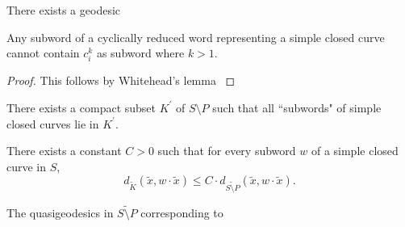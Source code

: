 \begin{lem}
	There exists a geodesic 
\end{lem}
\begin{lem}
	Any subword of a cyclically reduced word representing a simple closed curve cannot contain $c_i^k$ as subword where $k > 1$.
\end{lem}
\begin{proof}
	This follows by Whitehead's lemma \cite[Corollary 4.3]{Minsky}
\end{proof}

\begin{lem}
	There exists a compact subset $K^\prime$ of $S \setminus P$ such that all ``subwords" of simple closed curves lie in $K^\prime$.
\end{lem}

\begin{lem}
	There exists a constant $C > 0$ such that for every subword $w$ of a simple closed curve in $S$,\[d_{\tilde{K}}(\tilde{x}, w \cdot \tilde{x}) \leq C \cdot d_{\widetilde{S \setminus P}}(\tilde{x}, w \cdot \tilde{x}).\]
\end{lem}
 
\begin{lem}
	The quasigeodesics in $\widetilde{S \setminus P}$ corresponding to 
\end{lem}



